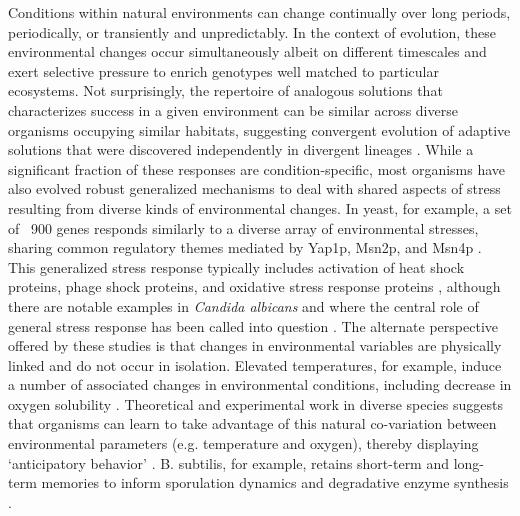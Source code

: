 Conditions within natural environments can change continually over long periods, periodically, or transiently and unpredictably.  In the context of evolution, these environmental changes occur simultaneously albeit on different timescales and exert selective pressure to enrich genotypes well matched to particular ecosystems.  Not surprisingly, the repertoire of analogous solutions that characterizes success in a given environment can be similar across diverse organisms occupying similar habitats, suggesting convergent evolution of adaptive solutions that were discovered independently in divergent lineages \cite{lauro_unique_2007,hentschel_molecular_2002}.  While a significant fraction of these responses are condition-specific, most organisms have also evolved robust generalized mechanisms to deal with shared aspects of stress resulting from diverse kinds of environmental changes.  In yeast, for example, a set of ~900 genes responds similarly to a diverse array of environmental stresses, sharing common regulatory themes mediated by Yap1p, Msn2p, and Msn4p \cite{gasch_genomic_2000}. This generalized stress response typically includes activation of heat shock proteins, phage shock proteins, and oxidative stress response proteins \cite{causton_remodeling_2001,he_positive_2010}, although there are notable examples in \textit{Candida albicans} and \halo where the central role of general stress response has been called into question \cite{enjalbert_stress-induced_2003,kaur_coordination_2010}.  The alternate perspective offered by these studies is that changes in environmental variables are physically linked and do not occur in isolation. Elevated temperatures, for example, induce a number of associated changes in environmental conditions, including decrease in oxygen solubility \cite{whitehead_diurnally_2009}. Theoretical and experimental work in diverse species suggests that organisms can learn to take advantage of this natural co-variation between environmental parameters (e.g. temperature and oxygen), thereby displaying `anticipatory behavior' \cite{tagkopoulos_predictive_2008,whitehead_diurnally_2009,wolf_memory_2008}.  B. subtilis, for example, retains short-term and long-term memories to inform sporulation dynamics and degradative enzyme synthesis \cite{wolf_memory_2008}.

